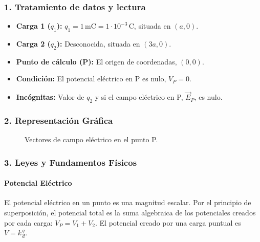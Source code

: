 \subsubsection*{1. Tratamiento de datos y lectura}
\begin{itemize}
    \item \textbf{Carga 1 ($q_1$):} $q_1 = 1\,\text{mC} = 1\cdot10^{-3}\,\text{C}$, situada en $(a,0)$.
    \item \textbf{Carga 2 ($q_2$):} Desconocida, situada en $(3a,0)$.
    \item \textbf{Punto de cálculo (P):} El origen de coordenadas, $(0,0)$.
    \item \textbf{Condición:} El potencial eléctrico en P es nulo, $V_P=0$.
    \item \textbf{Incógnitas:} Valor de $q_2$ y si el campo eléctrico en P, $\vec{E}_P$, es nulo.
\end{itemize}

\subsubsection*{2. Representación Gráfica}
\begin{figure}[H]
    \centering
    \caption{Vectores de campo eléctrico en el punto P.}
\end{figure}

\subsubsection*{3. Leyes y Fundamentos Físicos}
\paragraph{Potencial Eléctrico}
El potencial eléctrico en un punto es una magnitud escalar. Por el principio de superposición, el potencial total es la suma algebraica de los potenciales creados por cada carga: $V_P = V_1 + V_2$. El potencial creado por una carga puntual es $V = k\frac{q}{d}$.
